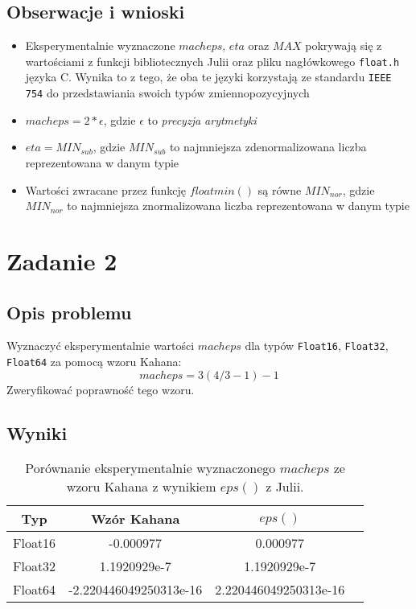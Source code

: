 \documentclass{article}
\begin{document}
\subsection{Obserwacje i wnioski}
\begin{itemize}
    \item Eksperymentalnie wyznaczone $macheps$, $eta$ oraz $MAX$ pokrywają się z wartościami z funkcji bibliotecznych
    Julii oraz pliku nagłówkowego \texttt{float.h} języka C. Wynika to z tego, że oba te języki korzystają ze standardu
    \texttt{IEEE 754} do przedstawiania swoich typów zmiennopozycyjnych

    \item $macheps = 2 * \epsilon$, gdzie $\epsilon$ to \textit{precyzja arytmetyki}

    \item $eta = MIN_{sub}$, gdzie $MIN_{sub}$ to najmniejsza zdenormalizowana liczba reprezentowana w danym typie

    \item Wartości zwracane przez funkcję $floatmin()$ są równe $MIN_{nor}$, gdzie $MIN_{nor}$ to najmniejsza
    znormalizowana liczba reprezentowana w danym typie
\end{itemize}

\section{Zadanie 2}
\subsection{Opis problemu}
Wyznaczyć eksperymentalnie wartości $macheps$ dla typów \texttt{Float16}, \texttt{Float32}, \texttt{Float64} za pomocą
wzoru Kahana:
$$macheps = 3(4/3 - 1) - 1$$
Zweryfikować poprawność tego wzoru.

\subsection{Wyniki}
\begin{table}[H]
\begin{adjustbox}{center}
\begin{tabular}{|c|c|c|c|}
    \hline
    Typ & Wzór Kahana & $eps()$\\
    \hline
    Float16 & -0.000977 & 0.000977\\
    \hline
    Float32 & 1.1920929e-7 & 1.1920929e-7\\
    \hline
    Float64 & -2.220446049250313e-16 & 2.220446049250313e-16\\
    \hline
\end{tabular}
\end{adjustbox}
\caption{Porównanie eksperymentalnie wyznaczonego $macheps$ ze wzoru Kahana z wynikiem $eps()$ z Julii.}
\end{table}
\end{document}
